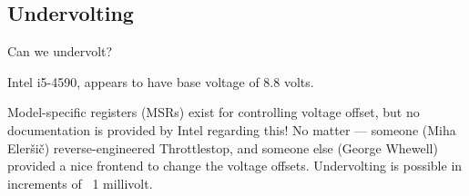 \subsection{Undervolting}

Can we undervolt?

Intel i5-4590, appears to have base voltage of 8.8 volts.

Model-specific registers (MSRs) exist for controlling voltage offset, but no
documentation is provided by Intel regarding this!
No matter — someone (Miha Eleršič) reverse-engineered Throttlestop, and someone
else (George Whewell) provided a nice frontend to change the voltage offsets.
Undervolting is possible in increments of ~1 millivolt.
